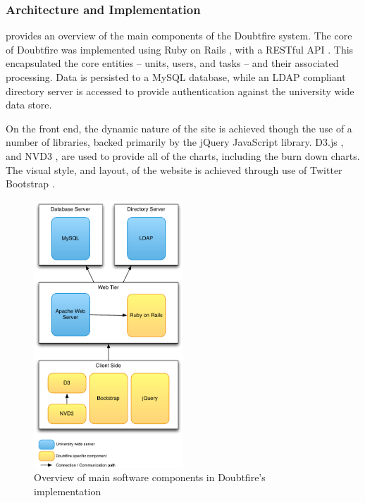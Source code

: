 
\clearpage
\subsubsection{Architecture and Implementation} %
\label{ssub:architecture_and_implementation}

 provides an overview of the main components of the Doubtfire system. The core of Doubtfire was implemented using Ruby on Rails \cite{Ruby:2013}, with a RESTful API \cite{Richardson:2007}. This encapsulated the core entities -- units, users, and tasks -- and their associated processing. Data is persisted to a MySQL \cite{mysql} database, while an LDAP \cite{Sermersheim:2006} compliant directory server is accessed to provide authentication against the university wide data store.

On the front end, the dynamic nature of the site is achieved though the use of a number of libraries, backed primarily by the jQuery \cite{jquery} JavaScript library. D3.js \cite{d3}, and NVD3 \cite{nvd3}, are used to provide all of the charts, including the burn down charts.  The visual style, and layout, of the website is achieved through use of Twitter Bootstrap \cite{TwitterBootstrap}.

\begin{figure}[htbp]
  \centering
  \includegraphics[width=0.5\textwidth]{DoubtfireArch}
  \caption{Overview of main software components in Doubtfire's implementation}
  \label{fig:doubtfire_arch}
\end{figure}

